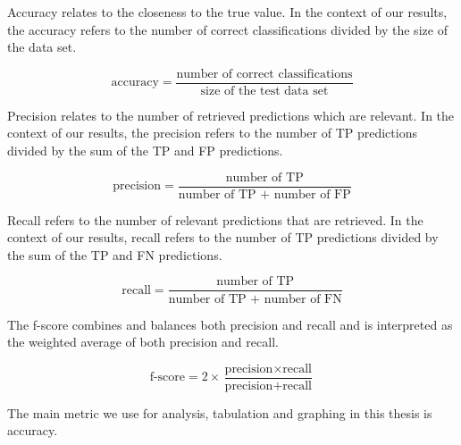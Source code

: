 Accuracy relates to the closeness to the true value. In the context of our results, the accuracy refers to the number of correct classifications 
divided by the size of the data set.

\[ \text{accuracy} = \frac{\text{number of correct classifications}}{\text{size of the test data set}}\]

Precision relates to the number of retrieved predictions which are relevant. In the context of our results, the precision refers to the number of TP predictions 
divided by the sum of the TP and FP predictions.

\[ \text{precision} = \frac{\text{number of TP}}{\text{number of TP + number of FP}}\]

Recall refers to the number of relevant predictions that are retrieved. In the context of our results, recall refers to the number of TP predictions 
divided by the sum of the TP and FN predictions.

\[ \text{recall} = \frac{\text{number of TP}}{\text{number of TP + number of FN}}\]

The f-score combines and balances both precision and recall and is interpreted as the weighted average of both precision and recall. 

\[ \text{f-score} = 2 \times \frac{\text{precision} \times \text{recall}}{\text{precision} + \text{recall}}\]

The main metric we use for analysis, tabulation and graphing in this thesis is accuracy.

